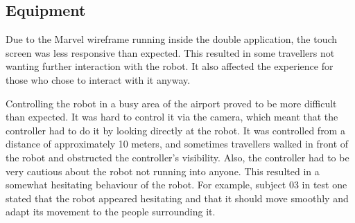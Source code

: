 \subsection{Equipment}
Due to the Marvel wireframe running inside the double application, the touch screen was less responsive than expected. This resulted in some travellers not wanting further interaction with the robot. It also affected the experience for those who chose to interact with it anyway.

Controlling the robot in a busy area of the airport proved to be more difficult than expected. It was hard to control it via the camera, which meant that the controller had to do it by looking directly at the robot. It was controlled from a distance of approximately 10 meters, and sometimes travellers walked in front of the robot and obstructed the controller's visibility. Also, the controller had to be very cautious about the robot not running into anyone. This resulted in a somewhat hesitating behaviour of the robot. For example, subject 03 in test one stated that the robot appeared hesitating and that it should move smoothly and adapt its movement to the people surrounding it.